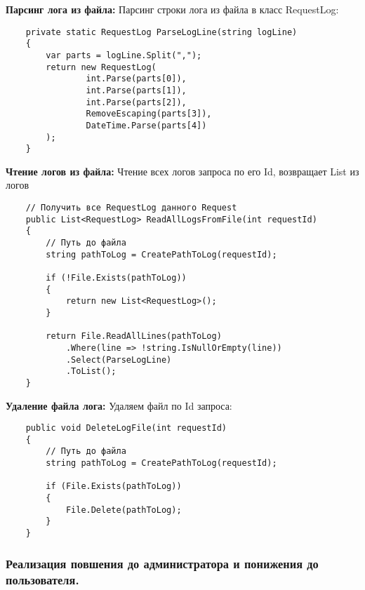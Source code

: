 \textbf{Парсинг лога из файла:} Парсинг строки лога из файла в класс RequestLog:
\begin{verbatim}
    private static RequestLog ParseLogLine(string logLine)
    {
        var parts = logLine.Split(",");
        return new RequestLog(
                int.Parse(parts[0]),
                int.Parse(parts[1]),
                int.Parse(parts[2]),
                RemoveEscaping(parts[3]),
                DateTime.Parse(parts[4])
        );
    }
\end{verbatim}

\textbf{Чтение логов из файла:} Чтение всех логов запроса по его Id, возвращает List из логов
\begin{verbatim}
    // Получить все RequestLog данного Request
    public List<RequestLog> ReadAllLogsFromFile(int requestId)
    {
        // Путь до файла
        string pathToLog = CreatePathToLog(requestId);

        if (!File.Exists(pathToLog))
        {
            return new List<RequestLog>();
        }

        return File.ReadAllLines(pathToLog)
            .Where(line => !string.IsNullOrEmpty(line))
            .Select(ParseLogLine)
            .ToList();
    }
\end{verbatim}

\textbf{Удаление файла лога:} Удаляем файл по Id запроса:
\begin{verbatim}
    public void DeleteLogFile(int requestId)
    {
        // Путь до файла
        string pathToLog = CreatePathToLog(requestId);

        if (File.Exists(pathToLog))
        {
            File.Delete(pathToLog);
        }
    }
\end{verbatim}

\subsubsection{Реализация повшения до администратора и понижения до пользователя.}
